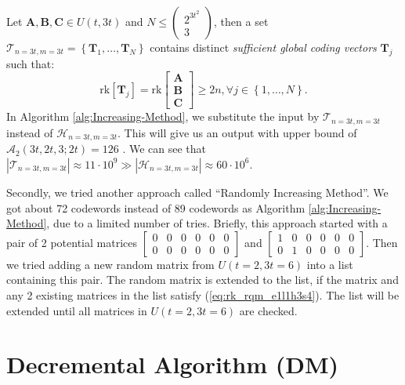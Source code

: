 \begin{defn}
 Let $\boldsymbol{A},\boldsymbol{B},\boldsymbol{C}\in U(t,3t)$ and
$N\leq\left(\begin{array}{c}
2^{3t^{2}}\\
3
\end{array}\right)$, then a set $\mathcal{T}_{n=3t,m=3t}=\left\{ \boldsymbol{T}_{1},\ldots,\boldsymbol{T}_{N}\right\} $
contains distinct \textit{sufficient global coding vectors} $\boldsymbol{T}_{j}$
such that:
\[
\mathrm{rk}\left[\boldsymbol{T}_{j}\right]=\mathrm{rk}\left[\begin{array}{c}
\boldsymbol{A}\\
\boldsymbol{B}\\
\boldsymbol{C}
\end{array}\right]\geq2n,\forall j\in\left\{ 1,\ldots,N\right\} .
\]
In Algorithm \ref{alg:Increasing-Method}, we substitute the input
by $\mathcal{T}_{n=3t,m=3t}$ instead of $\mathcal{H}_{n=3t,m=3t}$.
This will give us an output with upper bound of $\mathcal{A}_{2}\left(3t,2t,3;2t\right)=126$
\cite[Sec. V-B]{Zhang:2019}. We can see that $\left|\mathcal{T}_{n=3t,m=3t}\right|\approx11\cdot10^{9}\gg\left|\mathcal{H}_{n=3t,m=3t}\right|\approx60\cdot10^{6}$.
\end{defn}
Secondly, we tried another approach called ``Randomly Increasing
Method''. We got about 72 codewords instead of 89 codewords as Algorithm
\ref{alg:Increasing-Method}, due to a limited number of tries. Briefly,
this approach started with a pair of 2 potential matrices $\left[\begin{array}{cccccc}
0 & 0 & 0 & 0 & 0 & 0\\
0 & 0 & 0 & 0 & 0 & 0
\end{array}\right]$ and $\left[\begin{array}{cccccc}
1 & 0 & 0 & 0 & 0 & 0\\
0 & 1 & 0 & 0 & 0 & 0
\end{array}\right]$. Then we tried adding a new random matrix from $U\left(t=2,3t=6\right)$
into a list containing this pair. The random matrix is extended to
the list, if the matrix and any 2 existing matrices in the list satisfy
(\ref{eq:rk_rqm_e1l1h3s4}). The list will be extended until all matrices
in $U\left(t=2,3t=6\right)$ are checked.

\section{Decremental Algorithm (DM) \label{sec:Alternative-Approaches}}

